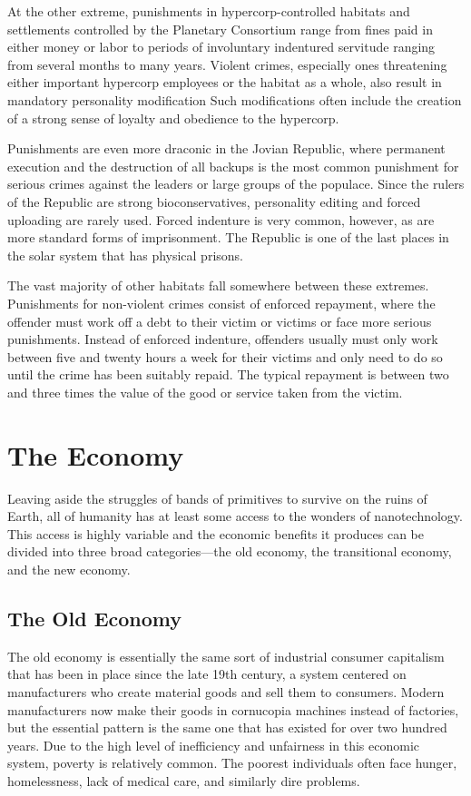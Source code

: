 At the other extreme, punishments in hypercorp-controlled
habitats and settlements controlled by the
Planetary Consortium range from fines paid in either 
money or labor to periods of involuntary indentured 
servitude ranging from several months to many years. 
Violent crimes, especially ones threatening either 
important hypercorp employees or the habitat as a 
whole, also result in mandatory personality modification
Such modifications often include the creation of a
strong sense of loyalty and obedience to the hypercorp.

Punishments are even more draconic in the Jovian 
Republic, where permanent execution and the destruction
of all backups is the most common punishment
for serious crimes against the leaders or large
groups of the populace. Since the rulers of the Republic
are strong bioconservatives, personality editing and
forced uploading are rarely used. Forced indenture is 
very common, however, as are more standard forms of 
imprisonment. The Republic is one of the last places 
in the solar system that has physical prisons.

The vast majority of other habitats fall somewhere 
between these extremes. Punishments for non-violent 
crimes consist of enforced repayment, where the offender
must work off a debt to their victim or victims
or face more serious punishments. Instead of enforced 
indenture, offenders usually must only work between 
five and twenty hours a week for their victims and 
only need to do so until the crime has been suitably 
repaid. The typical repayment is between two and 
three times the value of the good or service taken 
from the victim.

\section{The Economy}

Leaving aside the struggles of bands of primitives to 
survive on the ruins of Earth, all of humanity has at 
least some access to the wonders of nanotechnology. 
This access is highly variable and the economic benefits
it produces can be divided into three broad categories—the
old economy, the transitional economy,
and the new economy.

\subsection{The Old Economy}

The old economy is essentially the same sort of industrial
consumer capitalism that has been in place since
the late 19th century, a system centered on manufacturers
who create material goods and sell them to
consumers. Modern manufacturers now make their 
goods in cornucopia machines instead of factories, but 
the essential pattern is the same one that has existed 
for over two hundred years. Due to the high level of 
inefficiency and unfairness in this economic system, 
poverty is relatively common. The poorest individuals 
often face hunger, homelessness, lack of medical care, 
and similarly dire problems.

